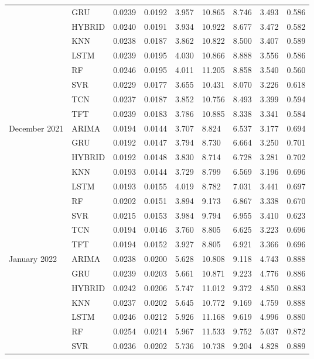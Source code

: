 \begin{tabular}{lllllllll}
 & GRU & 0.0239 & 0.0192 & 3.957 & 10.865 & 8.746 & 3.493 & 0.586 \\
 & HYBRID & 0.0240 & 0.0191 & 3.934 & 10.922 & 8.677 & 3.472 & 0.582 \\
 & KNN & 0.0238 & 0.0187 & 3.862 & 10.822 & 8.500 & 3.407 & 0.589 \\
 & LSTM & 0.0239 & 0.0195 & 4.030 & 10.866 & 8.888 & 3.556 & 0.586 \\
 & RF & 0.0246 & 0.0195 & 4.011 & 11.205 & 8.858 & 3.540 & 0.560 \\
 & SVR & 0.0229 & 0.0177 & 3.655 & 10.431 & 8.070 & 3.226 & 0.618 \\
 & TCN & 0.0237 & 0.0187 & 3.852 & 10.756 & 8.493 & 3.399 & 0.594 \\
 & TFT & 0.0239 & 0.0183 & 3.786 & 10.885 & 8.338 & 3.341 & 0.584 \\
December 2021 & ARIMA & 0.0194 & 0.0144 & 3.707 & 8.824 & 6.537 & 3.177 & 0.694 \\
 & GRU & 0.0192 & 0.0147 & 3.794 & 8.730 & 6.664 & 3.250 & 0.701 \\
 & HYBRID & 0.0192 & 0.0148 & 3.830 & 8.714 & 6.728 & 3.281 & 0.702 \\
 & KNN & 0.0193 & 0.0144 & 3.729 & 8.799 & 6.569 & 3.196 & 0.696 \\
 & LSTM & 0.0193 & 0.0155 & 4.019 & 8.782 & 7.031 & 3.441 & 0.697 \\
 & RF & 0.0202 & 0.0151 & 3.894 & 9.173 & 6.867 & 3.338 & 0.670 \\
 & SVR & 0.0215 & 0.0153 & 3.984 & 9.794 & 6.955 & 3.410 & 0.623 \\
 & TCN & 0.0194 & 0.0146 & 3.760 & 8.805 & 6.625 & 3.223 & 0.696 \\
 & TFT & 0.0194 & 0.0152 & 3.927 & 8.805 & 6.921 & 3.366 & 0.696 \\
January 2022 & ARIMA & 0.0238 & 0.0200 & 5.628 & 10.808 & 9.118 & 4.743 & 0.888 \\
 & GRU & 0.0239 & 0.0203 & 5.661 & 10.871 & 9.223 & 4.776 & 0.886 \\
 & HYBRID & 0.0242 & 0.0206 & 5.747 & 11.012 & 9.372 & 4.850 & 0.883 \\
 & KNN & 0.0237 & 0.0202 & 5.645 & 10.772 & 9.169 & 4.759 & 0.888 \\
 & LSTM & 0.0246 & 0.0212 & 5.926 & 11.168 & 9.619 & 4.996 & 0.880 \\
 & RF & 0.0254 & 0.0214 & 5.967 & 11.533 & 9.752 & 5.037 & 0.872 \\
 & SVR & 0.0236 & 0.0202 & 5.736 & 10.738 & 9.204 & 4.828 & 0.889 \\

\end{tabular}

